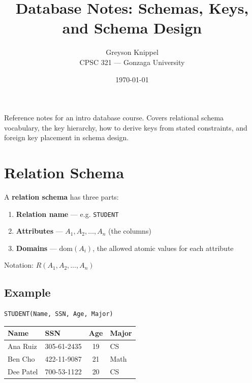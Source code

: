 \documentclass[12pt]{article}
\title{Database Notes: Schemas, Keys, and Schema Design}
\author{
Greyson Knippel \\[4pt]
CPSC 321 --- Gonzaga University
}
\date{\today}
\begin{document}
\maketitle

\noindent Reference notes for an intro database course. Covers relational schema
vocabulary, the key hierarchy, how to derive keys from stated constraints, and
foreign key placement in schema design.

\section{Relation Schema}

A \textbf{relation schema} has three parts:

\begin{enumerate}
    \item \textbf{Relation name} --- e.g. \texttt{STUDENT}
    \item \textbf{Attributes} --- $A_1, A_2, \ldots, A_n$ (the columns)
    \item \textbf{Domains} --- $\mathrm{dom}(A_i)$, the allowed atomic values for each attribute
\end{enumerate}

Notation: $R(A_1, A_2, \ldots, A_n)$

\subsection*{Example}

\begin{lstlisting}[style=plainschema]
STUDENT(Name, SSN, Age, Major)
\end{lstlisting}

\begin{table}[H]
\centering
\begin{tabular}{|l|l|c|l|}
\hline
\textbf{Name} & \textbf{SSN} & \textbf{Age} & \textbf{Major} \\
\hline
Ana Ruiz & 305-61-2435 & 19 & CS \\
Ben Cho & 422-11-9087 & 21 & Math \\
Dee Patel & 700-53-1122 & 20 & CS \\
\hline
\end{tabular}
\end{table}
\end{document}
